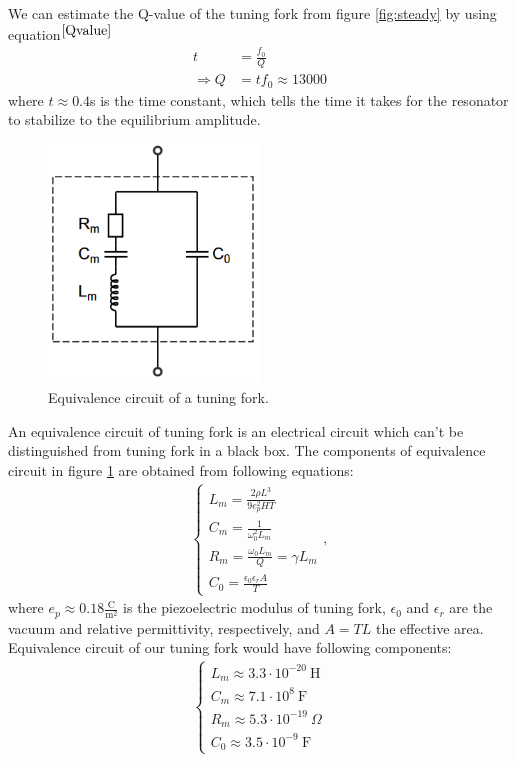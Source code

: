 \documentclass[12pt]{article}
\begin{document}
We can estimate the Q-value of the tuning fork from figure \ref{fig:steady} by using equation$^{\cite{Qvalue}}$
\begin{align*}
t &= \frac{f_0}{Q}\\
\Rightarrow Q &= tf_0 \approx 13000
\end{align*}
where $t \approx 0.4$s is the time constant, which tells the time it takes for the resonator to stabilize to the equilibrium amplitude.

\begin{figure}
\centering
\includegraphics[width = 0.5\textwidth]{equivalence_circuit}
\caption{Equivalence circuit of a tuning fork.} \label{fig:equivalence_circuit}
\end{figure}

An equivalence circuit of tuning fork is an electrical circuit which can't be distinguished from tuning fork in a black box. The components of equivalence circuit in figure \ref{fig:equivalence_circuit} are obtained from following equations:
\begin{align}
\begin{cases}
L_m = \frac{2\rho L^3}{9e_p^2HT}\\
C_m = \frac{1}{\omega_0^2L_m}\\
R_m = \frac{\omega_0 L_m}{Q}=\gamma L_m\\
C_0 = \frac{\epsilon_0\epsilon_rA}{T}
\end{cases},
\end{align}
where $e_p \approx 0.18 \frac{\mathrm{C}}{\mathrm{m}^2}$ is the piezoelectric modulus of tuning fork, $\epsilon_0$ and $\epsilon_r$ are the vacuum and relative permittivity, respectively, and $A = TL$ the effective area. Equivalence circuit of our tuning fork would have following components:
\begin{align*}
\begin{cases}
L_m \approx 3.3\cdot10^{-20}~\mathrm{H}\\
C_m \approx 7.1\cdot10^8~\mathrm{F}\\
R_m \approx 5.3\cdot10^{-19}~\Omega\\
C_0 \approx 3.5\cdot10^{-9}~\mathrm{F}
\end{cases}
\end{align*}
\end{document}

